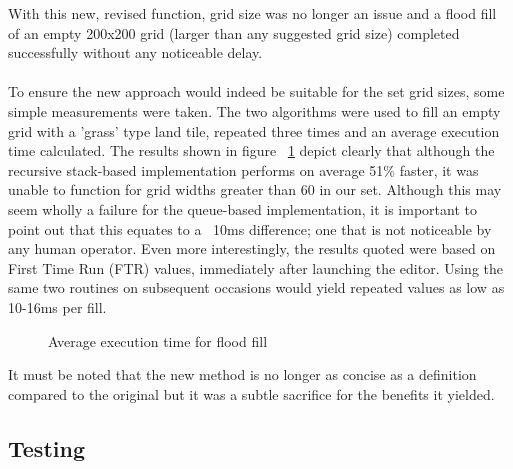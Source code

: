 With this new, revised function, grid size was no longer an issue and a flood fill of an empty 200x200 grid (larger than any suggested grid size) completed successfully without any noticeable delay.
\paragraph{}
To ensure the new approach would indeed be suitable for the set grid sizes, some simple measurements were taken. The two algorithms were used to fill an empty grid with a 'grass' type land tile, repeated three times and an average execution time calculated. The results shown in figure ~\ref{fig:floodChart} depict clearly that although the recursive stack-based implementation performs on average 51\% faster, it was unable to function for grid widths greater than 60 in our set. Although this may seem wholly a failure for the queue-based implementation, it is important to point out that this equates to a ~10ms difference; one that is not noticeable by any human operator.  Even more interestingly, the results quoted were based on First Time Run (FTR) values, immediately after launching the editor. Using the same two routines on subsequent occasions would yield repeated values as low as 10-16ms per fill.
 
\begin{figure}[h]
\centering
{}
\caption{Average execution time for flood fill}
\label{fig:floodChart}
\end{figure}

It must be noted that the new method is no longer as concise as a definition compared to the original but it was a subtle sacrifice for the benefits it yielded.

\subsection{Testing}

